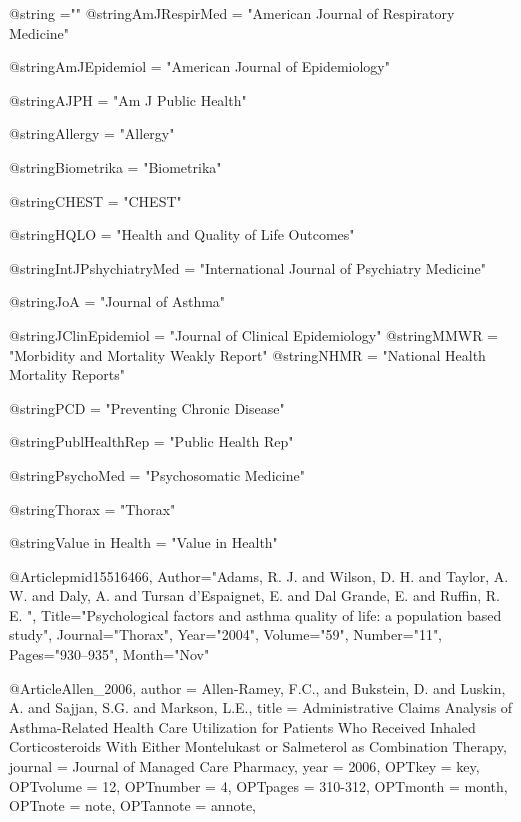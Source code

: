 @string{ ="" }
@string{AmJRespirMed = "American Journal of Respiratory Medicine"}

@string{AmJEpidemiol = "American Journal of Epidemiology"}

@string{AJPH = "Am J Public Health"}

@string{Allergy = "Allergy"}

@string{Biometrika = "Biometrika"}

@string{CHEST = "CHEST"}





@string{HQLO = "Health and Quality of Life Outcomes"}


@string{IntJPshychiatryMed = "International Journal of Psychiatry Medicine"}

@string{JoA = "Journal of Asthma"}

@string{JClinEpidemiol = "Journal of Clinical Epidemiology"}
@string{MMWR = "Morbidity and Mortality Weakly Report"}
@string{NHMR = "National Health Mortality Reports"}

@string{PCD = "Preventing Chronic Disease"}

@string{PublHealthRep = "Public Health Rep"}

@string{PsychoMed = "Psychosomatic Medicine"}

@string{Thorax = "Thorax"}

@string{Value in Health = "Value in Health"}



@Article{pmid15516466,
   Author="Adams, R. J.  and Wilson, D. H.  and Taylor, A. W.  and Daly, A.  and Tursan d'Espaignet, E.  and Dal Grande, E.  and Ruffin, R. E. ",
   Title="{{P}sychological factors and asthma quality of life: a population based study}",
   Journal="Thorax",
   Year="2004",
   Volume="59",
   Number="11",
   Pages="930--935",
   Month="Nov"
}

@Article{Allen_2006,
author = {Allen-Ramey, F.C., and Bukstein, D. and Luskin, A. and Sajjan, S.G. and Markson, L.E.},
title = {Administrative Claims Analysis of Asthma-Related Health Care Utilization for Patients Who Received Inhaled Corticosteroids With Either Montelukast or Salmeterol as Combination Therapy},
journal = {Journal of Managed Care Pharmacy},
year = {2006},
OPTkey = {key},
OPTvolume = {12},
OPTnumber = {4},
OPTpages = {310-312},
OPTmonth = {month},
OPTnote = {note},
OPTannote = {annote},
}

